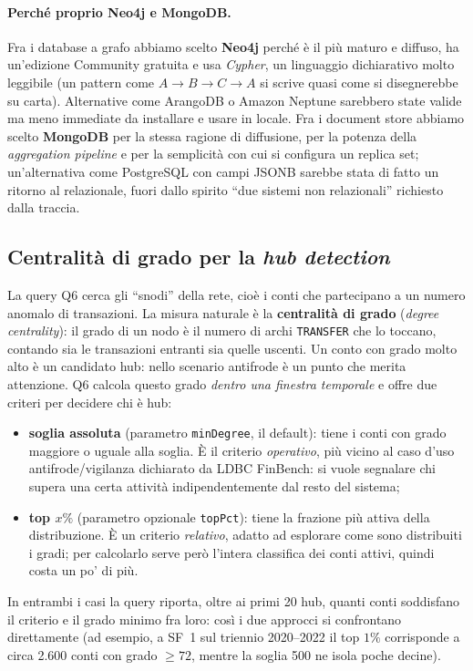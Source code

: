 \documentclass[11pt,a4paper]{article}
\begin{document}
\paragraph{Perch\'e proprio Neo4j e MongoDB.} Fra i database a grafo abbiamo
scelto \textbf{Neo4j} perch\'e \`e il pi\`u maturo e diffuso, ha un'edizione
Community gratuita e usa \emph{Cypher}, un linguaggio dichiarativo molto
leggibile (un pattern come $A\to B\to C\to A$ si scrive quasi come si
disegnerebbe su carta). Alternative come ArangoDB o Amazon Neptune sarebbero
state valide ma meno immediate da installare e usare in locale. Fra i document
store abbiamo scelto \textbf{MongoDB} per la stessa ragione di diffusione, per
la potenza della \emph{aggregation pipeline} e per la semplicit\`a con cui si
configura un replica set; un'alternativa come PostgreSQL con campi JSONB sarebbe
stata di fatto un ritorno al relazionale, fuori dallo spirito ``due sistemi non
relazionali'' richiesto dalla traccia.

\subsection{Centralit\`a di grado per la \emph{hub detection}}

La query Q6 cerca gli ``snodi'' della rete, cio\`e i conti che partecipano a un
numero anomalo di transazioni. La misura naturale \`e la \textbf{centralit\`a di
grado} (\emph{degree centrality}): il grado di un nodo \`e il numero di archi
\texttt{TRANSFER} che lo toccano, contando sia le transazioni entranti sia
quelle uscenti. Un conto con grado molto alto \`e un candidato hub: nello
scenario antifrode \`e un punto che merita attenzione. Q6 calcola questo grado
\emph{dentro una finestra temporale} e offre due criteri per decidere chi \`e
hub:
\begin{itemize}[nosep]
  \item \textbf{soglia assoluta} (parametro \texttt{minDegree}, il default):
  tiene i conti con grado maggiore o uguale alla soglia. \`E il criterio \emph{operativo},
  pi\`u vicino al caso d'uso antifrode/vigilanza dichiarato da LDBC FinBench: si
  vuole segnalare chi supera una certa attivit\`a indipendentemente dal resto
  del sistema;
  \item \textbf{top $x\%$} (parametro opzionale \texttt{topPct}): tiene la
  frazione pi\`u attiva della distribuzione. \`E un criterio \emph{relativo},
  adatto ad esplorare come sono distribuiti i gradi; per calcolarlo serve
  per\`o l'intera classifica dei conti attivi, quindi costa un po' di pi\`u.
\end{itemize}
In entrambi i casi la query riporta, oltre ai primi 20 hub, quanti conti
soddisfano il criterio e il grado minimo fra loro: cos\`i i due approcci si
confrontano direttamente (ad esempio, a SF~1 sul triennio 2020--2022 il top
$1\%$ corrisponde a circa 2.600 conti con grado $\ge 72$, mentre la soglia 500
ne isola poche decine).
\end{document}
